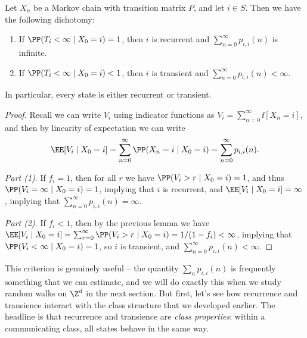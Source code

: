 \begin{theorem}
	Let $X_n$ be a Markov chain with transition matrix $P$, and let $i \in S$. Then we have the following dichotomy:
	\begin{enumerate}[label=(\arabic*)]
		\item If $\PP(T_i< \infty \mid X_0 = i) = 1$, then $i$ is recurrent and $\sum_{n = 0}^{\infty} p_{i, i}(n)$ is infinite.
		\item If $\PP(T_i < \infty \mid X_0 = i) < 1$, then $i$ is transient and $\sum_{n = 0}^{\infty} p_{i, i}(n) < \infty$.
	\end{enumerate}
	In particular, every state is either recurrent or transient.
\end{theorem}
\begin{proof}
	Recall we can write $V_i$ using indicator functions as
	$
	V_i = \sum_{n = 0}^{\infty} \ii[X_n = i],
	$
	and then by linearity of expectation we can write
	$$
	\EE[V_i \mid X_0 = i] = \sum_{n = 0}^{\infty} \PP(X_n = i \mid X_0 = i) = \sum_{n = 0}^{\infty} p_{i, i}(n).
	$$

	\emph{Part (1)}. If $f_i = 1$, then for all $r$ we have $\PP(V_i > r \mid X_0 = i) = 1$, and thus $\PP(V_i = \infty \mid X_0 = i) = 1$, implying that $i$ is recurrent, and $\EE[V_i \mid X_0 = i] = \infty$, implying that $\sum_{n = 0}^{\infty} p_{i, i}(n) = \infty$.

	\emph{Part (2)}. If $f_i < 1$, then by the previous lemma we have $\EE[V_i \mid X_0 = i] = \sum_{r = 0}^{\infty} \PP(V_i > r \mid X_0 = i) = 1/(1 - f_i) < \infty$, implying that $\PP(V_i < \infty \mid X_0 = i) = 1$, so $i$ is transient, and $\sum_{n = 0}^{\infty} p_{i, i}(n) < \infty$.
\end{proof}

This criterion is genuinely useful -- the quantity $\sum_n p_{i,i}(n)$ is frequently something that we can estimate, and we will do exactly this when we study random walks on $\Z^d$ in the next section. But first, let's see how recurrence and transience interact with the class structure that we developed earlier. The headline is that recurrence and transience are \emph{class properties}: within a communicating class, all states behave in the same way.

